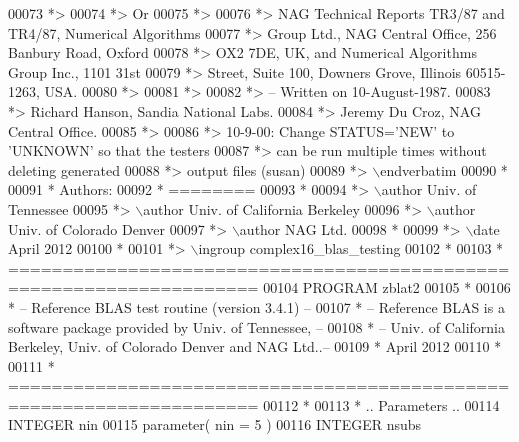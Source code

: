 \begin{DoxyCode}
00073 \textcolor{comment}{*>}
00074 \textcolor{comment}{*>       Or}
00075 \textcolor{comment}{*>}
00076 \textcolor{comment}{*>       NAG  Technical Reports TR3/87 and TR4/87,  Numerical Algorithms}
00077 \textcolor{comment}{*>       Group  Ltd.,  NAG  Central  Office,  256  Banbury  Road, Oxford}
00078 \textcolor{comment}{*>       OX2 7DE, UK,  and  Numerical Algorithms Group Inc.,  1101  31st}
00079 \textcolor{comment}{*>       Street,  Suite 100,  Downers Grove,  Illinois 60515-1263,  USA.}
00080 \textcolor{comment}{*>}
00081 \textcolor{comment}{*>}
00082 \textcolor{comment}{*> -- Written on 10-August-1987.}
00083 \textcolor{comment}{*>    Richard Hanson, Sandia National Labs.}
00084 \textcolor{comment}{*>    Jeremy Du Croz, NAG Central Office.}
00085 \textcolor{comment}{*>}
00086 \textcolor{comment}{*>    10-9-00:  Change STATUS='NEW' to 'UNKNOWN' so that the testers}
00087 \textcolor{comment}{*>              can be run multiple times without deleting generated}
00088 \textcolor{comment}{*>              output files (susan)}
00089 \textcolor{comment}{*> \(\backslash\)endverbatim}
00090 \textcolor{comment}{*}
00091 \textcolor{comment}{*  Authors:}
00092 \textcolor{comment}{*  ========}
00093 \textcolor{comment}{*}
00094 \textcolor{comment}{*> \(\backslash\)author Univ. of Tennessee }
00095 \textcolor{comment}{*> \(\backslash\)author Univ. of California Berkeley }
00096 \textcolor{comment}{*> \(\backslash\)author Univ. of Colorado Denver }
00097 \textcolor{comment}{*> \(\backslash\)author NAG Ltd. }
00098 \textcolor{comment}{*}
00099 \textcolor{comment}{*> \(\backslash\)date April 2012}
00100 \textcolor{comment}{*}
00101 \textcolor{comment}{*> \(\backslash\)ingroup complex16\_blas\_testing}
00102 \textcolor{comment}{*}
00103 \textcolor{comment}{*  =====================================================================}
00104       \textcolor{keyword}{PROGRAM} zblat2
00105 \textcolor{comment}{*}
00106 \textcolor{comment}{*  -- Reference BLAS test routine (version 3.4.1) --}
00107 \textcolor{comment}{*  -- Reference BLAS is a software package provided by Univ. of Tennessee,    --}
00108 \textcolor{comment}{*  -- Univ. of California Berkeley, Univ. of Colorado Denver and NAG Ltd..--}
00109 \textcolor{comment}{*     April 2012}
00110 \textcolor{comment}{*}
00111 \textcolor{comment}{*  =====================================================================}
00112 \textcolor{comment}{*}
00113 \textcolor{comment}{*     .. Parameters ..}
00114       \textcolor{keywordtype}{INTEGER}            nin
00115       parameter( nin = 5 )
00116       \textcolor{keywordtype}{INTEGER}            nsubs

\end{DoxyCode}
